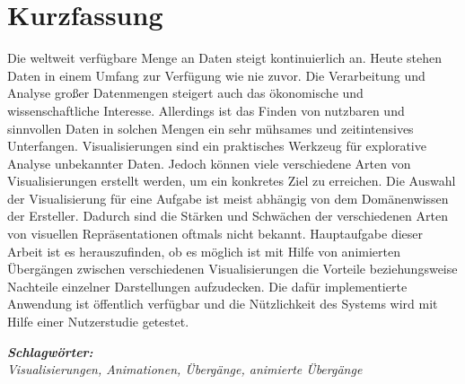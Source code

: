 
\section*{Kurzfassung}
\vspace{0.5cm}

Die weltweit verfügbare Menge an Daten steigt kontinuierlich an. Heute stehen Daten in einem Umfang zur Verfügung wie nie zuvor. Die Verarbeitung und Analyse großer Datenmengen steigert auch das ökonomische und wissenschaftliche Interesse. Allerdings ist das Finden von nutzbaren und sinnvollen Daten in solchen Mengen ein sehr mühsames und zeitintensives Unterfangen. Visualisierungen sind ein praktisches Werkzeug für explorative Analyse unbekannter Daten. Jedoch können viele verschiedene Arten von Visualisierungen erstellt werden, um ein konkretes Ziel zu erreichen. Die Auswahl der Visualisierung für eine Aufgabe ist meist abhängig von dem Domänenwissen der Ersteller. Dadurch sind die Stärken und Schwächen der verschiedenen Arten von visuellen Repräsentationen oftmals nicht bekannt. Hauptaufgabe dieser Arbeit ist es herauszufinden, ob es möglich ist mit Hilfe von animierten Übergängen zwischen verschiedenen Visualisierungen die Vorteile beziehungsweise Nachteile einzelner Darstellungen aufzudecken. Die dafür implementierte Anwendung ist öffentlich verfügbar und die Nützlichkeit des Systems wird mit Hilfe einer Nutzerstudie getestet.

\vspace{0.5cm}
\textbf{\textit{Schlagwörter:}}\\
\textit{Visualisierungen, Animationen, Übergänge, animierte Übergänge}

